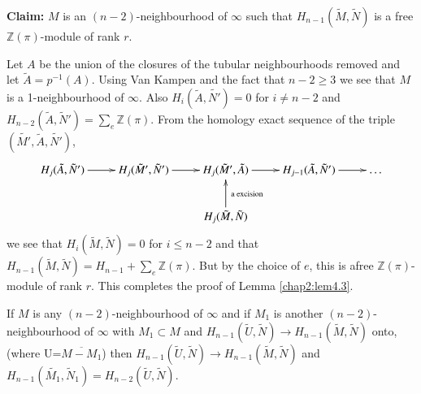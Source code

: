 \bigskip
\noindent\textbf{Claim:}
 $M$ is an $(n-2)$-neighbourhood of $\infty$ such that
$H_{n-1}(\tilde{M}, \tilde{N})$ is a free $\mathbb{Z}(\pi)$-module of
rank $r$. 

Let $A$ be the union of the closures of the tubular neighbourhoods
removed and let $\tilde{A} = p^{-1}(A)$. Using Van Kampen and the fact
that $n-2 \geq 3$ we see that $M$ is a 1-neighbourhood of
$\infty$. Also $H_i (\tilde{A},\tilde{N'}) = 0$ for $i \neq n-2$ and
$H_{n-2}(\tilde{A}, \tilde{N}')= \sum \limits_e \mathbb{Z}(\pi)$. From
the homology exact sequence of the triple $ (\tilde{M'}, \tilde{A},
\tilde{N'})$,  
{\fontsize{10}{12}\selectfont
\[
\xymatrix{
H_j (\tilde{A}, \tilde{N}')  \ar[r] & H_j (\tilde{M}', \tilde{N}')
\ar[r] & H_j (\tilde{M}', \tilde{A}) \ar[r] & H_{j-1} (\tilde{A},
\tilde{N}') \ar[r] & \ldots  \\
& & H_j (\tilde{M}, \tilde{N})\ar[u]_{\text{ a excision}} & & 
}
\]}\relax
we see that $H_i (\tilde{M}, \tilde{N}) = 0$ for $i \leq n-2$ and that
$H_{n-1} (\tilde{M}, \tilde{N})= H_{n-1} + \sum \limits_e \mathbb{Z}
(\pi)$. But by the choice of $e$, this is a\pageoriginale free
$\mathbb{Z}(\pi)$-module of rank $r$. This completes the proof of
Lemma \ref{chap2:lem4.3}. 

\setcounter{remark}{3}
\begin{remark}\label{chap2:rem4.4}%
If $M$ is any $(n-2)$-neighbourhood of $\infty$ and if $M_1$ is
another $(n-2)$-neighbourhood of $\infty$ with $M_1 \subset M$ and
$H_{n-1} (\tilde{U}, \tilde{N})\to H_{n-1} (\tilde{M}, \tilde{N})$
onto, (where U=$\overline{M-M_1}$) then $H_{n-1} (\tilde{U},
\tilde{N})\to H_{n-1} (\tilde{M}, \tilde{N})$ and $H_{n-1}
(\tilde{M_1}, \tilde{N}_1) = H_{n-2} (\tilde{U}, \tilde{N})$. 
\end{remark}

